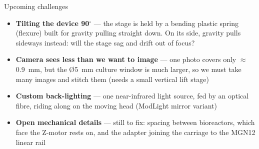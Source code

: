 \documentclass[aspectratio=169,10pt]{beamer}
\begin{document}
\begin{frame}[t]{Upcoming challenges}
  \begin{itemize}
    \item \textbf{Tilting the device 90$^\circ$} — the stage is held by a bending
          plastic spring (flexure) built for gravity pulling straight down. On its
          side, gravity pulls sideways instead: will the stage sag and drift out of
          focus?
    \item \textbf{Camera sees less than we want to image} — one photo covers only
          $\approx$0.9~mm, but the \O5~mm culture window is much larger, so we must
          take many images and stitch them (needs a small vertical lift stage)
    \item \textbf{Custom back-lighting} — one near-infrared light source, fed by an
          optical fibre, riding along on the moving head (ModLight mirror variant)
    \item \textbf{Open mechanical details} — still to fix: spacing between
          bioreactors, which face the Z-motor rests on, and the adapter joining the
          carriage to the MGN12 linear rail
  \end{itemize}
\end{frame}
\end{document}
